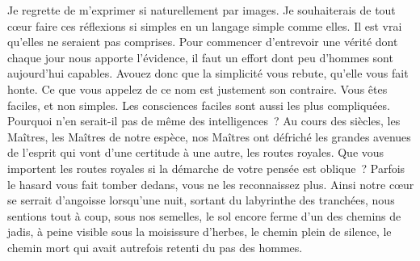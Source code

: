 \documentclass[french,twoside]{book} %
\begin{document}
Je regrette de m’exprimer si naturellement par images. Je souhaiterais de tout cœur faire ces réflexions si simples en un langage simple comme elles. Il est vrai qu’elles ne seraient pas comprises. Pour commencer d’entrevoir une vérité dont chaque jour nous apporte l’évidence, il faut un effort dont peu d’hommes sont aujourd’hui capables. Avouez donc que la simplicité vous rebute, qu’elle vous fait honte. Ce que vous appelez de ce nom est justement son contraire. Vous êtes faciles, et non simples. Les consciences faciles sont aussi les plus compliquées. Pourquoi n’en serait-il pas de même des intelligences ? Au cours des siècles, les Maîtres, les Maîtres de notre espèce, nos Maîtres ont défriché les grandes avenues de l’esprit qui vont d’une certitude à une autre, les routes royales. Que vous importent les routes royales si la démarche de votre pensée est oblique ? Parfois le hasard vous fait tomber dedans, vous ne les reconnaissez plus. Ainsi notre cœur se serrait d’angoisse lorsqu’une nuit, sortant du labyrinthe des tranchées, nous sentions tout à coup, sous nos semelles, le sol encore ferme d’un des chemins de jadis, à peine visible sous la moisissure d’herbes, le chemin plein de silence, le chemin mort qui avait autrefois retenti du pas des hommes.\par
\end{document}
